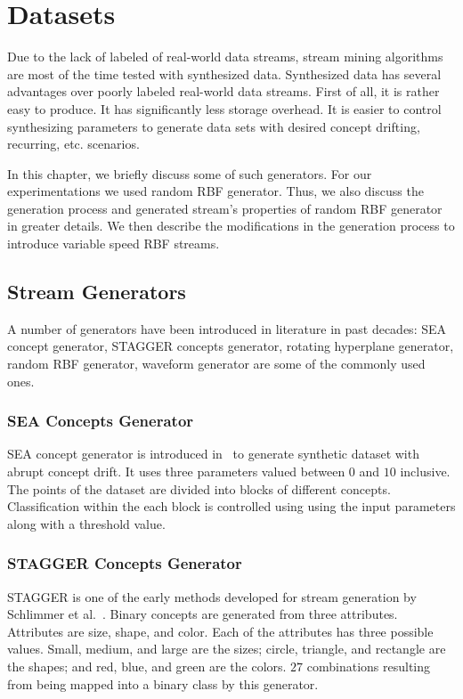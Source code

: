\chapter{Datasets}
\label{chp:dataset}
Due to the lack of labeled of real-world data streams, stream mining algorithms are most of the time tested with synthesized data. Synthesized data has several advantages over poorly labeled real-world data streams. First of all, it is rather easy to produce. It has significantly less storage overhead. It is easier to control synthesizing parameters to generate data sets with desired concept drifting, recurring, etc. scenarios.

In this chapter, we briefly discuss some of such generators. For our experimentations we used random RBF generator. Thus, we also discuss the generation process and generated stream's properties of random RBF generator in greater details. We then describe the modifications in the generation process to introduce variable speed RBF streams.

\section{Stream Generators}
A number of generators have been introduced in literature in past decades: SEA concept generator, STAGGER concepts generator, rotating hyperplane generator, random RBF generator, waveform generator are some of the commonly used ones. 

\subsection{SEA Concepts Generator}
SEA concept generator is introduced in~\cite{street01:sea} to generate synthetic dataset with abrupt concept drift. It uses three parameters valued between $0$ and $10$ inclusive. The points of the dataset are divided into blocks of different concepts. Classification within the each block is controlled using using the input parameters along with a threshold value.

\subsection{STAGGER Concepts Generator}
STAGGER is one of the early methods developed for stream generation by Schlimmer et al.~\cite{schlimmer86:stagger}. Binary concepts are generated from three attributes. Attributes are size, shape, and color. Each of the attributes has three possible values. Small, medium, and large are the sizes; circle, triangle, and rectangle are the shapes; and red, blue, and green are the colors. $27$ combinations resulting from being mapped into a binary class by this generator.

